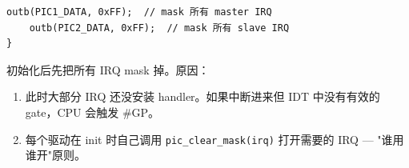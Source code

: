 \begin{lstlisting}[style=cstyle]
    outb(PIC1_DATA, 0xFF);  // mask 所有 master IRQ
    outb(PIC2_DATA, 0xFF);  // mask 所有 slave IRQ
}
\end{lstlisting}

\begin{designbox}
初始化后先把所有 IRQ mask 掉。原因：
\begin{enumerate}
  \item 此时大部分 IRQ 还没安装 handler。如果中断进来但 IDT 中没有有效的 gate，CPU 会触发 \#GP。
  \item 每个驱动在 init 时自己调用 \texttt{pic\_clear\_mask(irq)} 打开需要的 IRQ — "谁用谁开"原则。
\end{enumerate}
\end{designbox}


